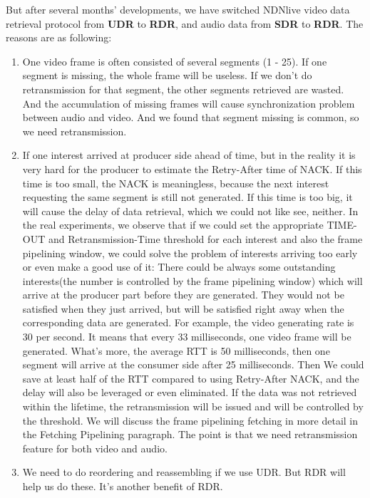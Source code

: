 \begin{enumerate}
But after several months' developments, we have switched NDNlive video data retrieval protocol from \textbf{UDR} to \textbf{RDR}, and audio data from \textbf{SDR} to \textbf{RDR}. The reasons are as following:
	\begin{enumerate}
		\item One video frame is often consisted of several segments (1 - 25). If one segment is missing, the whole frame will be useless. If we don't do retransmission for that segment, the other segments retrieved are wasted. And the accumulation of missing frames will cause synchronization problem between audio and video. And we found that segment missing is common, so we need retransmission.
		\item If one interest arrived at producer side ahead of time, but in the reality it is very hard for the producer to estimate the Retry-After time of NACK. If this time is too small, the NACK is meaningless, because the next interest requesting the same segment is still not generated. If this time is too big, it will cause the delay of data retrieval, which we could not like see, neither. In the real experiments, we observe that if we could set the appropriate TIME-OUT and Retransmission-Time threshold for each interest and also the frame pipelining window, we could solve the problem of interests arriving too early or even make a good use of it: There could be always some outstanding interests(the number is controlled by the frame pipelining window) which will arrive at the producer part before they are generated. They would not be satisfied when they just arrived, but will be satisfied right away when the corresponding data are generated. For example, the video generating rate is 30 per second. It means that every 33 milliseconds, one video frame will be generated. What's more, the average RTT is 50 milliseconds, then one segment will arrive at the consumer side after 25 milliseconds. Then We could save at least half of the RTT compared to using Retry-After NACK, and the delay will also be leveraged or even eliminated. If the data was not retrieved within the lifetime, the retransmission will be issued and will be controlled by the threshold. We will discuss the frame pipelining fetching in more detail in the Fetching Pipelining paragraph. The point is that we need retransmission feature for both video and audio. 
		\item We need to do reordering and reassembling if we use UDR. But RDR will help us do these. It's another benefit of RDR.
	\end{enumerate}

\end{enumerate}
